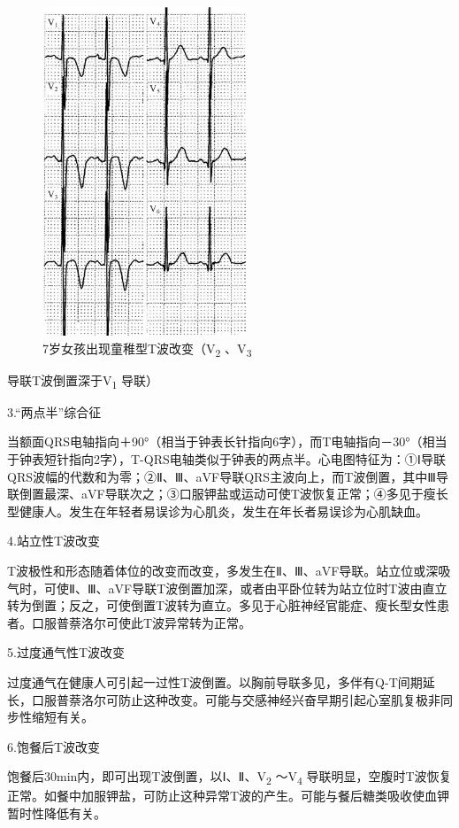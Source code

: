 \begin{figure}[!htbp]
 \centering
 \includegraphics[width=2.40625in,height=3.86458in]{./images/Image00097.jpg}
 \captionsetup{justification=centering}
 \caption{7岁女孩出现童稚型T波改变（V\textsubscript{2} 、V\textsubscript{3}}
 \label{fig6-5}
  \end{figure} 
导联T波倒置深于V\textsubscript{1} 导联）

3.“两点半”综合征

当额面QRS电轴指向＋90°（相当于钟表长针指向6字），而T电轴指向－30°（相当于钟表短针指向2字），T-QRS电轴类似于钟表的两点半。心电图特征为：①Ⅰ导联QRS波幅的代数和为零；②Ⅱ、Ⅲ、aVF导联QRS主波向上，而T波倒置，其中Ⅲ导联倒置最深、aVF导联次之；③口服钾盐或运动可使T波恢复正常；④多见于瘦长型健康人。发生在年轻者易误诊为心肌炎，发生在年长者易误诊为心肌缺血。

4.站立性T波改变

T波极性和形态随着体位的改变而改变，多发生在Ⅱ、Ⅲ、aVF导联。站立位或深吸气时，可使Ⅱ、Ⅲ、aVF导联T波倒置加深，或者由平卧位转为站立位时T波由直立转为倒置；反之，可使倒置T波转为直立。多见于心脏神经官能症、瘦长型女性患者。口服普萘洛尔可使此T波异常转为正常。

5.过度通气性T波改变

过度通气在健康人可引起一过性T波倒置。以胸前导联多见，多伴有Q-T间期延长，口服普萘洛尔可防止这种改变。可能与交感神经兴奋早期引起心室肌复极非同步性缩短有关。

6.饱餐后T波改变

饱餐后30min内，即可出现T波倒置，以Ⅰ、Ⅱ、V\textsubscript{2}
～V\textsubscript{4}
导联明显，空腹时T波恢复正常。如餐中加服钾盐，可防止这种异常T波的产生。可能与餐后糖类吸收使血钾暂时性降低有关。

